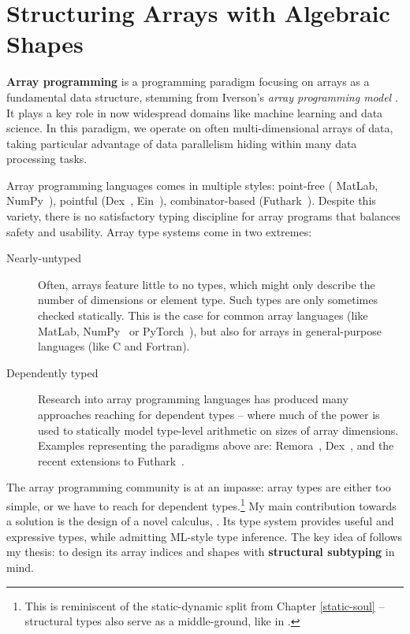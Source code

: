 \chapter{Structuring Arrays with Algebraic Shapes}
\label{star}

\textbf{Array programming} is a programming paradigm focusing on arrays as a fundamental data structure, stemming from Iverson's \emph{array programming model} \cite{apl}. It plays a key role in now widespread domains like machine learning and data science. In this paradigm, we operate on often multi-dimensional arrays of data, taking particular advantage of data parallelism hiding within many data processing tasks. 

Array programming languages comes in multiple styles: point-free (\eg{} MatLab, NumPy~\cite{numpy}), pointful (Dex~\cite{dex}, Ein~\cite{ein}), combinator-based (Futhark~\cite{futhark}). Despite this variety, there is no satisfactory typing discipline for array programs that balances safety and usability. Array type systems come in two extremes: \begin{description}
    \item[Nearly-untyped] Often, arrays feature little to no types, which might only describe the number of dimensions or element type. Such types are only sometimes checked statically. This is the case for common array languages (like MatLab, NumPy~\cite{numpy} or PyTorch~\cite{pytorch}), but also for arrays in general-purpose languages (like C and Fortran).
    \item[Dependently typed] Research into array programming languages has produced many approaches reaching for dependent types -- where much of the power is used to statically model type-level arithmetic on sizes of array dimensions. Examples representing the paradigms above are: Remora~\cite{remora}, Dex~\cite{dex}, and the recent extensions to Futhark~\cite{futhark-size-dependent, futhark-size-dependent-towards}.
\end{description}

The array programming community is at an impasse: array types are either too simple, or we have to reach for dependent types.\footnote{This is reminiscent of the static-dynamic split from Chapter \ref{static-soul} -- structural types also serve as a middle-ground, like in \starr{}.} My main contribution towards a solution is the design of a novel calculus, \textbf{\starr{}}. Its type system provides useful and expressive types, while admitting ML-style type inference.
The key idea of \starr{} follows my thesis: to design its array indices and shapes with \textbf{structural subtyping} in mind.

